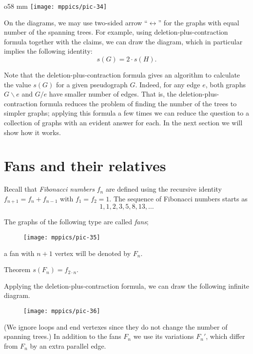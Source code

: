 \begin{wrapfigure}{o}{58 mm}
\vskip-0mm
\centering
\texttt{[image: mppics/pic-34]}
\vskip-0mm
\end{wrapfigure}

On the diagrams, we may use two-sided arrow ``$\leftrightarrow$'' for the graphs with equal number of the spanning trees.
For example, using deletion-plus-contraction formula together with the claims, we can draw the diagram, which in particular implies the following identity:
\[s(G)=2\cdot s(H).\]

Note that the deletion-plus-contraction formula gives an algorithm to calculate  the value $s(G)$ for a given pseudograph $G$.
Indeed, for any edge $e$, both graphs $G\backslash e$ and $G/e$ have smaller number of edges.
That is, the deletion-plus-contraction formula reduces the problem of finding the number of the trees to simpler graphs;
applying this formula a few times we can reduce the question to a collection of graphs with an evident answer for each.
In the next section we will show how it works.


 
\section*{Fans and their relatives}



Recall that \emph{Fibonacci numbers} $f_n$ are defined using the recursive identity 
$f_{n+1}=f_n+f_{n-1}$
with $f_1=f_2=1$.
The sequence of Fibonacci numbers starts as
\[1,1,2,3,5,8,13,\dots\]

The graphs of the following type are called \emph{fans}; 
\begin{figure}[h!]
\centering
\texttt{[image: mppics/pic-35]}
\end{figure}
a fan with $n+1$ vertex will be denoted by $F_n$. 

\begin{thm}{Theorem}\label{thm:fans}
$s(F_n)=f_{2\cdot n}$.
\end{thm}

Applying the deletion-plus-contraction formula, we can draw the following infinite diagram.
\begin{figure}[h!]
\centering
\texttt{[image: mppics/pic-36]}
\end{figure}
(We ignore loops and end vertexes since they do not change the number of spanning trees.)
In addition to the fans $F_n$ we use its variations $F_n'$, which differ from $F_n$ by an extra parallel edge.

